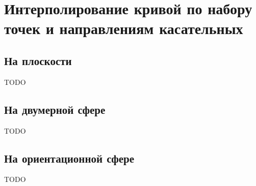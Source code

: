 \section{Интерполирование кривой по набору точек и направлениям касательных}

\subsection*{На плоскости}

TODO

\subsection*{На двумерной сфере}

TODO

\subsection*{На ориентационной сфере}

TODO
